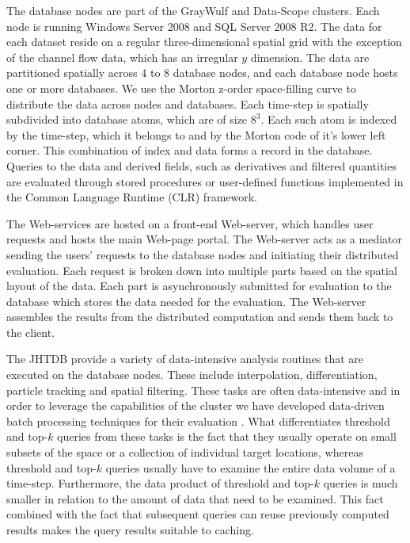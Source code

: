 \documentclass{sig-alternate}
\begin{document}
The database nodes are part of the GrayWulf \cite{Szalay} and Data-Scope \cite{DataScope} clusters. Each node
is running Windows Server 2008 and SQL Server 2008 R2. The data for each dataset reside on a regular three-dimensional spatial grid with the
exception of the channel flow data, which has an irregular $y$ dimension. The data are partitioned spatially across 4 to 8
database nodes, and each database node hosts one or more databases. We use the Morton z-order space-filling
curve to distribute the data across nodes and databases. Each time-step is spatially subdivided
into database atoms, which are of size $8^3$. Each such atom is indexed by the time-step, which it belongs to and
by the Morton code of it's lower left corner. This combination of index and data forms a record in the database.
Queries to the data and derived fields, such as derivatives and filtered quantities are evaluated through
stored procedures or user-defined functions implemented in the Common Language Runtime (CLR) framework.

The Web-services are hosted on a front-end Web-server, which handles user requests and hosts the main Web-page portal.
The Web-server acts as a mediator sending the users' requests to the database nodes and initiating their distributed evaluation. 
Each request is broken down into multiple parts based on the spatial layout of the data. Each part is asynchronously submitted for evaluation 
to the database which stores the data needed for the evaluation.
The Web-server assembles the results from the distributed computation and sends them back to the client.


The JHTDB provide a variety of data-intensive analysis routines that are executed on the database nodes. These include interpolation, 
differentiation, particle tracking and spatial filtering. These tasks are often data-intensive and in order to leverage the capabilities of the cluster we
have developed data-driven batch processing techniques for their evaluation \cite{KanovSC11, KanovSC12}. What differentiates threshold and
top-$k$ queries from these tasks is the fact that they usually operate on small subsets of the space or a collection of individual target locations, whereas
threshold and top-$k$ queries usually have to examine the entire data volume of a time-step. Furthermore, the data product of threshold and top-$k$ 
queries is much smaller in relation to the amount of data that need to be examined. This fact combined with the fact that subsequent queries can reuse 
previously computed results makes the query results suitable to caching. 
\end{document}
